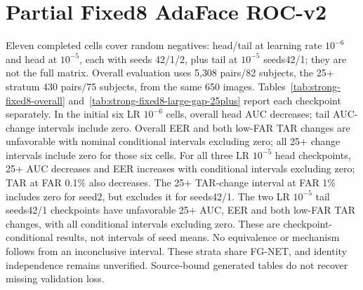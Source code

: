 \documentclass[journal]{IEEEtran}
\begin{document}
\section{Partial Fixed8 AdaFace ROC-v2}\label{sec:strong-fixed8-roc-v2}
Eleven completed cells cover random negatives: head/tail at learning rate $10^{-6}$
and head at $10^{-5}$, each with seeds 42/1/2, plus tail at $10^{-5}$ seeds42/1;
they are not the full matrix. Overall evaluation
uses 5{,}308 pairs/82 subjects, the 25+ stratum 430 pairs/75 subjects, from the same 650 images.
Tables~\ref{tab:strong-fixed8-overall} and~\ref{tab:strong-fixed8-large-gap-25plus}
report each checkpoint separately. In the initial six LR $10^{-6}$ cells,
overall head AUC decreases; tail AUC-change intervals include zero. Overall EER
and both low-FAR TAR changes are unfavorable with nominal conditional intervals
excluding zero; all 25+ change intervals include zero for those six cells.
For all three LR $10^{-5}$ head checkpoints, 25+ AUC decreases and EER increases
with conditional intervals excluding zero; TAR at FAR 0.1\% also decreases.
The 25+ TAR-change interval at FAR 1\% includes zero for seed2, but excludes it
for seeds42/1. The two LR $10^{-5}$ tail seeds42/1 checkpoints have unfavorable
25+ AUC, EER and both low-FAR TAR changes, with all conditional intervals excluding
zero. These are checkpoint-conditional results, not intervals of seed means.
No equivalence or mechanism follows from an
inconclusive interval. These strata share FG-NET, and identity independence remains
unverified. Source-bound generated tables do not recover missing validation loss.
\end{document}
